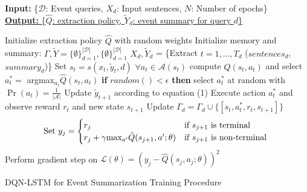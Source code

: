 \documentclass[]{beamer}
\begin{document}
\begin{frame}
\begin{algorithm}[H]
  \tiny
        \textbf{Input:} { \rm  \{$\mathcal{D}$: Event queries, $X_d$: Input sentences, $N$: Number of epochs\} } \\
        \underline{\textbf{Output:} \rm \{$\hat{Q}$: extraction policy, $\tilde{Y}_d$: event summary for query $d$\} }
\begin{algorithmic}[1]
    \STATE \rm Initialize extraction policy $\hat{Q}$ with random weights
    \STATE \rm Initialize memory and summary: $\Gamma, \tilde{Y} =  \{\emptyset \}^{\mathcal{|D|}}_{d=1},  \{\emptyset \}^{\mathcal{|D|}}_{d=1} $
            \STATE $X_{d}, \tilde{Y}_{d}$ = \{Extract $t=1,...,T_d$ ($sentences_d$, $summary_d$)\}
                \STATE Set $s_t = s(x_t, \tilde{y}_t, d)$
                \STATE $ \forall a_t \in \mathcal{A}(s_t)$ \textrm{compute} $\hat{Q}(s_t, a_t)$ and select $a^{*}_t =$ argmax$_{a_{t}}\hat{Q}(s_t, a_t)$
                \STATE  \textbf{if} $random() < \epsilon$ \textbf{then} select $a^{*}_t $ at random with $\Pr(a_t) =\frac{1}{| \mathcal{A} |} $
                \STATE Update $\tilde{y}_{t+1}$ according to equation (1)
                \STATE Execute action $a^{*}_t$ and observe reward $r_t$ and new state $s_{t+1}$
                \STATE Update $\Gamma_d = \Gamma_d \cup \{ [s_t, a^{*}_t, r_t, s_{t+1}]\}$
            \ENDFOR
        \ENDFOR
                \STATE \[\textrm{Set } y_j =
                        \begin{cases}
                            r_j                                             & \text{if $s_{j+1}$ is terminal } \\
                                r_j + \gamma $max$_{a'}\hat{Q}(s_{j+1}, a'; \theta)     & \text{if $s_{j+1}$ is non-terminal } 
                        \end{cases} 
                        \]
                        \STATE Perform gradient step on $\mathcal{L}(\theta) = (y_j - \hat{Q}(s_j, a_j; \theta))^2$
            \ENDFOR
    \ENDFOR
\end{algorithmic}
\caption*{ DQN-LSTM for Event Summarization Training Procedure}
\label{alg:seq}
\end{algorithm}
\end{frame}

	
\end{document}
